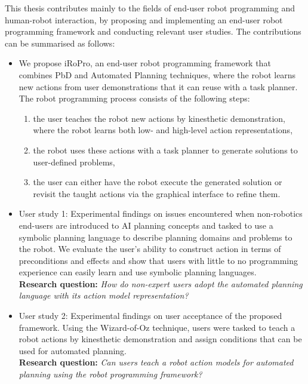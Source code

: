 This thesis contributes mainly to the fields of end-user robot programming and human-robot interaction, by proposing and implementing an end-user robot programming framework and conducting relevant user studies.
The contributions can be summarised as follows:
\begin{itemize}
	\item {We propose iRoPro, an end-user robot programming framework that combines PbD and Automated Planning techniques, where the robot learns new actions from user demonstrations that it can reuse with a task planner. %
	The robot programming process consists of the following steps:
	\begin{enumerate}
		\item the user teaches the robot new actions by kinesthetic demonstration, where the robot learns both low- and high-level action representations,
		\item the robot uses these actions with a task planner to generate solutions to user-defined problems,
		\item the user can either have the robot execute the generated solution or revisit the taught actions via the graphical interface to refine them.
	\end{enumerate}
}

    \item {User study 1: Experimental findings on issues encountered when non-robotics end-users are introduced to AI planning concepts and tasked to use a symbolic planning language to describe planning domains and problems to the robot. 
    	We evaluate the user's ability to construct action in terms of preconditions and effects and show that users with little to no programming experience can easily learn and use symbolic planning languages.\\%
    	\textbf{Research question:} \textit{How do non-expert users adopt the automated planning language with its action model representation?}}

    \item {User study 2: Experimental findings on user acceptance of the proposed framework. Using the Wizard-of-Oz technique, users were tasked to teach a robot actions by kinesthetic demonstration and assign conditions that can be used for automated planning.\\
    	\textbf{Research question:} \textit{Can users teach a robot action models for automated planning using the robot programming framework?}}


\end{itemize}
